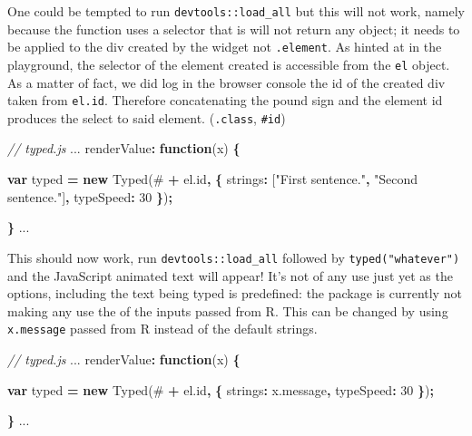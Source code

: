 \documentclass[
]{krantz}
\makeatletter
\newenvironment{Shaded}{\begin{snugshade}}{\end{snugshade}}
\newcommand{\AttributeTok}[1]{\textcolor[rgb]{0.61,0.61,0.61}{#1}}
\newcommand{\CommentTok}[1]{\textcolor[rgb]{0.37,0.37,0.37}{\textit{#1}}}
\newcommand{\DataTypeTok}[1]{\textcolor[rgb]{0.27,0.27,0.27}{#1}}
\newcommand{\DecValTok}[1]{\textcolor[rgb]{0.06,0.06,0.06}{#1}}
\newcommand{\KeywordTok}[1]{\textcolor[rgb]{0.27,0.27,0.27}{\textbf{#1}}}
\newcommand{\NormalTok}[1]{#1}
\newcommand{\OperatorTok}[1]{\textcolor[rgb]{0.43,0.43,0.43}{\textbf{#1}}}
\newcommand{\StringTok}[1]{\textcolor[rgb]{0.5,0.5,0.5}{#1}}
\newcommand{\VariableTok}[1]{\textcolor[rgb]{0,0,0}{#1}}
\newenvironment{kframe}{%
\medskip{}
\setlength{\fboxsep}{.8em}
 \def\at@end@of@kframe{}%
 \ifinner\ifhmode%
  \def\at@end@of@kframe{\end{minipage}}%
  \begin{minipage}{\columnwidth}%
 \fi\fi%
 \def\FrameCommand##1{\hskip\@totalleftmargin \hskip-\fboxsep
 \colorbox{shadecolor}{##1}\hskip-\fboxsep
     \hskip-\linewidth \hskip-\@totalleftmargin \hskip\columnwidth}%
 \MakeFramed {\advance\hsize-\width
   \@totalleftmargin\z@ \linewidth\hsize
   \@setminipage}}%
 {\par\unskip\endMakeFramed%
 \at@end@of@kframe}
\renewenvironment{Shaded}{\begin{kframe}}{\end{kframe}}
\makeatother
\begin{document}
One could be tempted to run \texttt{devtools::load\_all} but this will not work, namely because the function uses a selector that is will not return any object; it needs to be applied to the div created by the widget not \texttt{.element}. As hinted at in the playground, the selector of the element created is accessible from the \texttt{el} object. As a matter of fact, we did log in the browser console the id of the created div taken from \texttt{el.id}. Therefore concatenating the pound sign and the element id produces the select to said element. (\texttt{.class}, \texttt{\#id})

\begin{Shaded}
\begin{Highlighting}[]
\CommentTok{// typed.js}
\NormalTok{...}
\NormalTok{renderValue}\OperatorTok{:} \KeywordTok{function}\NormalTok{(x) }\OperatorTok{\{}

  \KeywordTok{var}\NormalTok{ typed }\OperatorTok{=} \KeywordTok{new} \AttributeTok{Typed}\NormalTok{(}\StringTok{\textquotesingle{}\#\textquotesingle{}} \OperatorTok{+} \VariableTok{el}\NormalTok{.}\AttributeTok{id}\OperatorTok{,} \OperatorTok{\{}
    \DataTypeTok{strings}\OperatorTok{:}\NormalTok{ [}\StringTok{"First sentence."}\OperatorTok{,} \StringTok{"Second sentence."}\NormalTok{]}\OperatorTok{,}
    \DataTypeTok{typeSpeed}\OperatorTok{:} \DecValTok{30}
  \OperatorTok{\}}\NormalTok{)}\OperatorTok{;}

\OperatorTok{\}}
\NormalTok{...}
\end{Highlighting}
\end{Shaded}

This should now work, run \texttt{devtools::load\_all} followed by \texttt{typed("whatever")} and the JavaScript animated text will appear! It's not of any use just yet as the options, including the text being typed is predefined: the package is currently not making any use the of the inputs passed from R. This can be changed by using \texttt{x.message} passed from R instead of the default strings.

\begin{Shaded}
\begin{Highlighting}[]
\CommentTok{// typed.js}
\NormalTok{...}
\NormalTok{renderValue}\OperatorTok{:} \KeywordTok{function}\NormalTok{(x) }\OperatorTok{\{}

  \KeywordTok{var}\NormalTok{ typed }\OperatorTok{=} \KeywordTok{new} \AttributeTok{Typed}\NormalTok{(}\StringTok{\textquotesingle{}\#\textquotesingle{}} \OperatorTok{+} \VariableTok{el}\NormalTok{.}\AttributeTok{id}\OperatorTok{,} \OperatorTok{\{}
    \DataTypeTok{strings}\OperatorTok{:} \VariableTok{x}\NormalTok{.}\AttributeTok{message}\OperatorTok{,}
    \DataTypeTok{typeSpeed}\OperatorTok{:} \DecValTok{30}
  \OperatorTok{\}}\NormalTok{)}\OperatorTok{;}

\OperatorTok{\}}
\NormalTok{...}
\end{Highlighting}
\end{Shaded}
\end{document}
